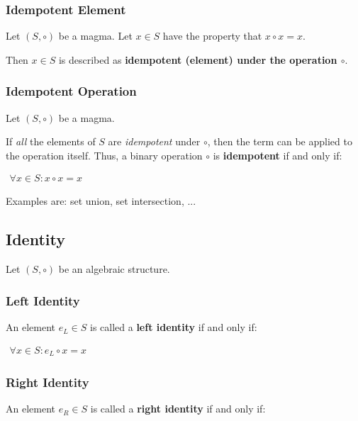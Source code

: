 \subsubsection{Idempotent Element}
Let $(S, \circ)$ be a magma. Let $x \in S$ have the property that
$ x \circ x = x$.

Then $x \in S $ is described as \textbf{idempotent (element) under the
  operation $\circ$}.

\subsubsection{Idempotent Operation}
Let $(S, \circ)$ be a magma.


If \textit{all} the elements of $S$ are \textit{idempotent} under
$\circ$, then the term can be applied to the operation itself. Thus, a
binary operation $\circ$ is \textbf{idempotent} if and only if:

\begin{math}
  \begin{array}{c}
    \forall x \in S: x \circ x = x
  \end{array}
\end{math}

Examples are: set union, set intersection, ...



\subsection{Identity}
\label{sec:identity}

Let $(S, \circ)$ be an algebraic structure.


\subsubsection{Left Identity}
An element $e_L \in S$ is called a \textbf{left identity} if and only
if:

\begin{math}
  \begin{array}{c}
    \forall x \in S: e_L \circ x = x
  \end{array}
\end{math}

\subsubsection{Right Identity}
An element $e_R \in S$ is called a \textbf{right identity} if and only
if:

